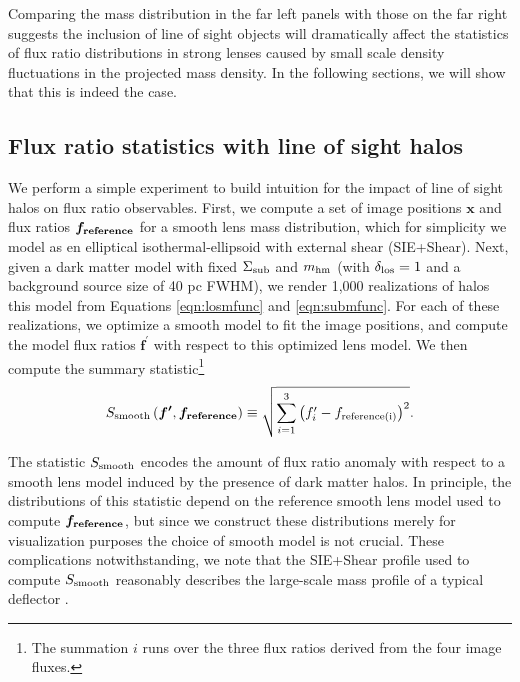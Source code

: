 Comparing the mass distribution in the far left panels with those on the far right suggests the inclusion of line of sight objects will dramatically affect the statistics of flux ratio distributions in strong lenses caused by small scale density fluctuations in the projected mass density. In the following sections, we will show that this is indeed the case.

\subsection{Flux ratio statistics with line of sight halos}
\label{ssec:lostats}
We perform a simple experiment to build intuition for the impact of line of sight halos on flux ratio observables. First, we compute a set of image positions $\boldsymbol{x}$ and flux ratios $\boldsymbol{f_{\rm{reference}}}$ for a smooth lens mass distribution, which for simplicity we model as en elliptical isothermal-ellipsoid with external shear (SIE+Shear). Next, given a dark matter model with fixed $\Sigma_{\rm{sub}}$ and ${m_{\rm{hm}}}$ (with $\delta_{\rm{los}} = 1$ and a background source size of 40 pc FWHM), we render 1,000 realizations of halos this model from Equations \ref{eqn:losmfunc} and \ref{eqn:submfunc}. For each of these realizations, we optimize a smooth model to fit the image positions, and compute the model flux ratios $\boldsymbol{f^{\prime}}$ with respect to this optimized lens model. We then compute the summary statistic\footnote{The summation $i$ runs over the three flux ratios derived from the four image fluxes.}
\begin{equation}
\label{eqn:summary_statsmooth}
S_{\rm{smooth}} \left(\boldsymbol{f^{\prime}},\boldsymbol{f_{\rm{reference}}} \right) \equiv \sqrt{\sum_{i=1}^{3} \left({f}^{\prime}_{i} - f_{\rm{reference(i)}} \right)^2}.
\end{equation}

The statistic $S_{\rm{smooth}}$ encodes the amount of flux ratio anomaly with respect to a smooth lens model induced by the presence of dark matter halos. In principle, the distributions of this statistic depend on the reference smooth lens model used to compute $\boldsymbol{f_{\rm{reference}}}$, but since we construct these distributions merely for visualization purposes the choice of smooth model is not crucial.  These complications notwithstanding, we note that the SIE+Shear profile used to compute $S_{\rm{smooth}}$ reasonably describes the large-scale mass profile of a typical deflector \citep{Auger++10,Gilman++17}. 

